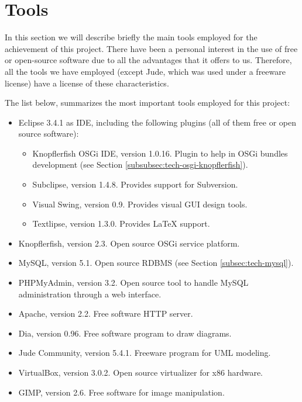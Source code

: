 
\section{Tools}
\label{sec:tools}
In this section we will describe briefly the main tools employed for the
achievement of this project. 
There have been a personal interest in the use of free or open-source software
due to all the advantages that it offers to us. Therefore, all the tools we 
have employed (except Jude, which was used under a freeware license) have a
license of these characteristics.

The list below, summarizes the most important tools employed for this project:

\begin{itemize}
  \item Eclipse 3.4.1 as IDE, including the following plugins (all of them free
  or open source software):
  		\begin{itemize}
            \item Knopflerfish OSGi IDE, version 1.0.16. Plugin to help in OSGi
            bundles development (see Section
            \ref{subsubsec:tech-osgi-knopflerfish}).
            \item Subclipse, version 1.4.8. Provides support for Subversion.
            \item Visual Swing, version 0.9. Provides visual GUI design tools.
            \item Textlipse, version 1.3.0. Provides \LaTeX{} support.
          \end{itemize}
   \item Knopflerfish, version 2.3. Open source OSGi service platform.
   \item MySQL, version 5.1. Open source RDBMS (see Section
   \ref{subsec:tech-mysql}).
   \item PHPMyAdmin, version 3.2. Open source tool to handle MySQL
   administration through a web interface.
   \item Apache, version 2.2. Free software HTTP server.
   \item Dia, version 0.96. Free software program to draw diagrams.
   \item Jude Community, version 5.4.1. Freeware program for UML modeling.
   \item VirtualBox, version 3.0.2. Open source virtualizer for x86 hardware.
   \item GIMP, version 2.6. Free software for image manipulation.
          
\end{itemize}
